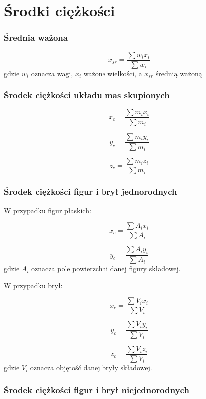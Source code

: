 \section{Środki ciężkości}

\subsubsection*{Średnia ważona}

\begin{equation}
    x_{sr} = \dfrac{\sum w_i x_i}{\sum w_i}
\end{equation}
gdzie $w_i$ oznacza wagi, $x_i$ ważone wielkości, a $x_{sr}$ średnią ważoną

\subsubsection*{Środek ciężkości układu mas skupionych}

\begin{equation}
    x_c = \dfrac{\sum m_i x_i}{\sum m_i}
\end{equation}

\[
    y_c = \dfrac{\sum m_i y_i}{\sum m_i}
\]

\[
    z_c = \dfrac{\sum m_i z_i}{\sum m_i}
\]

\subsubsection*{Środek ciężkości figur i brył jednorodnych}

W przypadku figur płaskich:

\begin{equation}
    x_c = \dfrac{\sum A_i x_i}{\sum A_i}
\end{equation}

\[
    y_c = \dfrac{\sum A_i y_i}{\sum A_i}
\]
gdzie $A_i$ oznacza pole powierzchni danej figury składowej.

W przypadku brył:

\begin{equation}
    x_c = \dfrac{\sum V_i x_i}{\sum V_i}
\end{equation}

\[
    y_c = \dfrac{\sum V_i y_i}{\sum V_i}
\]

\[
    z_c = \dfrac{\sum V_i z_i}{\sum V_i}
\]
gdzie $V_i$ oznacza objętość danej bryły składowej.

\subsubsection*{Środek ciężkości figur i brył niejednorodnych}

